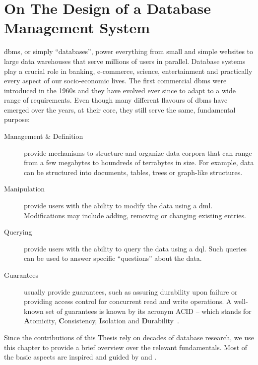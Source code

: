\chapter{On The Design of a Database Management System}
\label{chapter:theory_databases}


\acrfull{dbms}, or simply ``databases'', power everything from small and simple websites to large data warehouses that serve millions of users in parallel. Database systems play a crucial role in banking, e-commerce, science, entertainment and practically every aspect of our socio-economic lives. The first commercial \gls{dbms} were introduced in the 1960s \cite{Garcia:2009Database} and they have evolved ever since to adapt to a wide range of requirements. Even though many different flavours of \gls{dbms} have emerged over the years, at their core, they still serve the same, fundamental purpose:

\begin{description}
    \item[Management \& Definition]  provide mechanisms to structure and organize data corpora that can range from a few megabytes to houndreds of terrabytes in size. For example, data can be structured into documents, tables, trees or graph-like structures.
    \item[Manipulation]  provide users with the ability to modify the data using a \gls{dml}. Modifications may include adding, removing or changing existing entries.
    \item[Querying]  provide users with the ability to query the data using a \gls{dql}. Such queries can be used to answer specific ``questions'' about the data.
    \item[Guarantees]  usually provide guarantees, such as assuring durability upon failure or providing access control for concurrent read and write operations. A well-known set of guarantees is known by its acronym ACID -- which stands for \textbf{A}tomicity, \textbf{C}onsistency, \textbf{I}solation and \textbf{D}urability~\cite{Haerder:1983principles}.
\end{description}

Since the contributions of this Thesis rely on decades of database research, we use this chapter to provide a brief overview over the relevant fundamentals. Most of the basic aspects are inspired and guided by \cite{Garcia:2009Database} and \cite{Petrov:2019Database}.


